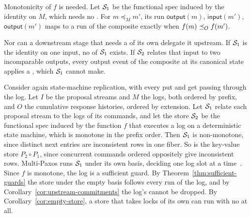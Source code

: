 Monotonicity of $f$ is needed.  Let $\mathcal{S}_1$ be the functional spec induced
by the identity on $M$, which needs no \commitment.  For $m\preceq_M m'$, its
run $\mathsf{output}(m)$, $\mathsf{input}(m')$, $\mathsf{output}(m')$ maps to
a run of the composite exactly when $f(m)\preceq_O f(m')$.

Nor can a downstream stage that needs a \commitment of its own delegate it
upstream.  If $\mathcal{S}_1$ is the identity on one input, no \commitment of
$\mathcal{S}_1$ exists.  If $\mathcal{S}_2$ relates that input to two incomparable
outputs, every output event of the composite at its canonical state applies a
\commitment, which $\mathcal{S}_1$ cannot make.

\begin{example}
\label{ex:committed-log-composition}
Consider again state-machine replication, with every put and get passing
through the log.  Let $I$ be the proposal streams and $M$ the logs, both
ordered by prefix, and $O$ the cumulative response histories, ordered by
extension.  Let $\mathcal{S}_1$ relate each proposal stream to the logs of its
commands, and let the store $\mathcal{S}_2$ be the functional spec induced by the
function $f$ that executes a log on a deterministic state machine, which is
monotone in the prefix order.  Then $\mathcal{S}_1$ is non-monotone, since distinct next entries are inconsistent rows in one fiber.  So is the key-value store
$P_2\circ P_1$, since concurrent commands ordered oppositely give inconsistent rows.  Multi-Paxos runs $\mathcal{S}_1$ under its own basis, deciding one log
slot at a time~\cite{schneider1990smr,lamport2001paxos}.  Since $f$ is
monotone, the log is a sufficient guard.  By Theorem~\ref{thm:sufficient-guards} the store under the empty basis follows every run of the log, and by Corollary~\ref{cor:upstream-commitments} the log's \commitments cannot be
dropped.  By Corollary~\ref{cor:empty-store}, a store that takes locks of its
own can run with no \commitments at all.
\end{example}

